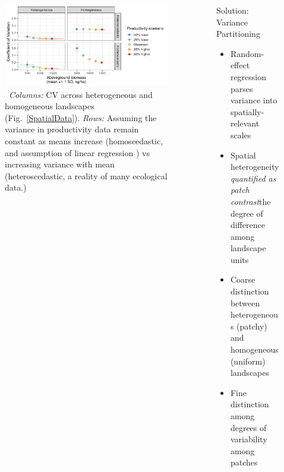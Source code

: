 \begin{frame}[t]
\begin{columns}[t]
\begin{column}{\twocolwid}
\begin{columns}[T]
\begin{column}{0.6\textwidth}
\begin{figure}
	\begin{center}
		\includegraphics[width=1.5\maxwidth]{figure/SpatialResults}
		\caption{~\emph{Columns:} CV across heterogeneous and homogeneous landscapes (Fig.~\ref{SpatialData}). \emph{Rows:} Assuming the variance in productivity data remain constant as means increase (homoscedastic, and assumption of linear regression ) vs increasing variance with mean (heteroscedastic, a reality of many ecological data.)}
		\label{SpatialExample}
	\end{center}
\end{figure}

\end{column}%
\end{columns}  %

\end{column} %

\begin{column}{\sepwid}\end{column} %

\begin{column}{\onecolwid} %
	\vspace{-1cm}
\begin{block}{Solution: Variance Partitioning} \end{block}
	\vspace{-2cm}
\begin{itemize}
	\item Random-effect regression parses variance into spatially-relevant scales
	\item Spatial heterogeneity \emph{quantified as patch contrast}\textemdash the degree of difference among landscape units
	\item Coarse distinction between heterogeneous (patchy) and homogeneous (uniform) landscapes
	\item Fine distinction among degrees of variability among patches
\end{itemize} 


\end{column}
\end{columns}
\end{frame}
